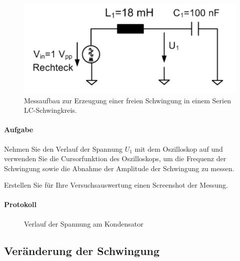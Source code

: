 \documentclass[10pt]{report}
\begin{document}
        \begin{center}
            \begin{figure}[H]
                \includegraphics[width=\textwidth]{Abbildung16.png}
                \caption{Messaufbau zur Erzeugung einer freien Schwingung in einem Serien LC-Schwingkreis.}
                \label{fig:abb16}
            \end{figure}
        \end{center}

        \paragraph{Aufgabe}
        Nehmen Sie den Verlauf der Spannung $U_1$ mit dem Oszilloskop auf und verwenden
        Sie die Cursorfunktion des Oszilloskops, um die Frequenz der Schwingung
        sowie die Abnahme der Amplitude der Schwingung zu messen.

        \vspace{0.5cm}

        Erstellen Sie für Ihre Versuchsauswertung einen Screenshot der Messung.

        \paragraph{Protokoll}
        \begin{center}
            \begin{figure}[H]
                \caption{Verlauf der Spannung am Kondensator}
            \end{figure}
        \end{center}

        \subsection{Veränderung der Schwingung}
\end{document}
